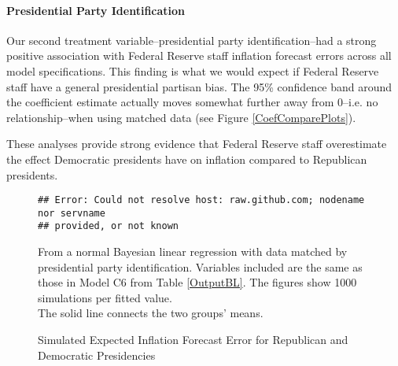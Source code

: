 \documentclass[a4paper]{article}\usepackage{graphicx, color}
\makeatletter
\newenvironment{kframe}{%
 \def\FrameCommand##1{\hskip\@totalleftmargin \hskip-\fboxsep
 \colorbox{shadecolor}{##1}\hskip-\fboxsep
     \hskip-\linewidth \hskip-\@totalleftmargin \hskip\columnwidth}%
 \MakeFramed {\advance\hsize-\width
   \@totalleftmargin\z@ \linewidth\hsize
   \@setminipage}}%
 {\par\unskip\endMakeFramed}
\newenvironment{knitrout}{}{} %
\makeatother
\begin{document}
\paragraph{Presidential Party Identification}

Our second treatment variable--presidential party identification--had a strong positive association with Federal Reserve staff inflation forecast errors across all model specifications. This finding is what we would expect if Federal Reserve staff have a general presidential partisan bias. The 95\% confidence band around the coefficient estimate actually moves somewhat further away from 0--i.e. no relationship--when using matched data (see Figure \ref{CoefComparePlots}).  

These analyses provide strong evidence that Federal Reserve staff overestimate the effect Democratic presidents have on inflation compared to Republican presidents.

\begin{figure}[t]
    \caption{Simulated Expected Inflation Forecast Error for Republican and Democratic Presidencies}
    \label{ExpectValueParty}
    \begin{center}

\begin{knitrout}
\color{fgcolor}\begin{kframe}
\begin{verbatim}
## Error: Could not resolve host: raw.github.com; nodename nor servname
## provided, or not known
\end{verbatim}
\end{kframe}
\end{knitrout}

    \end{center}
    \begin{singlespace}
        {\scriptsize{From a normal Bayesian linear regression with data matched by presidential party identification. Variables included are the same as those in Model C6 from Table \ref{OutputBL}. The figures show 1000 simulations per fitted value. \\ The solid line connects the two groups' means.}}
    \end{singlespace}
\end{figure}
\end{document}
